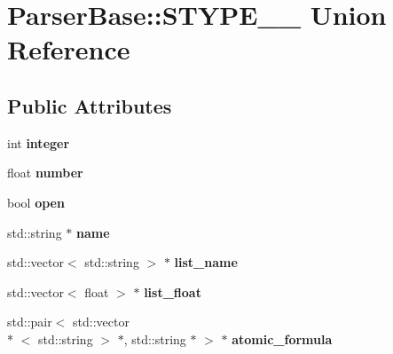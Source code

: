 \hypertarget{unionParserBase_1_1STYPE____}{\section{Parser\+Base\+:\+:S\+T\+Y\+P\+E\+\_\+\+\_\+ Union Reference}
\label{unionParserBase_1_1STYPE____}
}
\subsection*{Public Attributes}
\begin{DoxyCompactItemize}
\item 
\hypertarget{unionParserBase_1_1STYPE_____af8152366c391a9a3c6dfeebd38dd6072}{int {\bfseries integer}}\label{unionParserBase_1_1STYPE_____af8152366c391a9a3c6dfeebd38dd6072}

\item 
\hypertarget{unionParserBase_1_1STYPE_____a3d0cb98bf31057ecd7a908afbe3ca55f}{float {\bfseries number}}\label{unionParserBase_1_1STYPE_____a3d0cb98bf31057ecd7a908afbe3ca55f}

\item 
\hypertarget{unionParserBase_1_1STYPE_____a0666d59fce9371c2a4d93b2fa8b299ce}{bool {\bfseries open}}\label{unionParserBase_1_1STYPE_____a0666d59fce9371c2a4d93b2fa8b299ce}

\item 
\hypertarget{unionParserBase_1_1STYPE_____af9a7a51fe1e387c4c8214d7942e2a58a}{std\+::string $\ast$ {\bfseries name}}\label{unionParserBase_1_1STYPE_____af9a7a51fe1e387c4c8214d7942e2a58a}

\item 
\hypertarget{unionParserBase_1_1STYPE_____acadc01542881f7e6add2ea0e05562e8b}{std\+::vector$<$ std\+::string $>$ $\ast$ {\bfseries list\+\_\+name}}\label{unionParserBase_1_1STYPE_____acadc01542881f7e6add2ea0e05562e8b}

\item 
\hypertarget{unionParserBase_1_1STYPE_____a4bd64b9de1820c87495a8bd2c914e9ad}{std\+::vector$<$ float $>$ $\ast$ {\bfseries list\+\_\+float}}\label{unionParserBase_1_1STYPE_____a4bd64b9de1820c87495a8bd2c914e9ad}

\item 
\hypertarget{unionParserBase_1_1STYPE_____a96b9185e300e325c901f02ab6c4b3297}{std\+::pair$<$ std\+::vector\\*
$<$ std\+::string $>$ $\ast$, std\+::string $\ast$ $>$ $\ast$ {\bfseries atomic\+\_\+formula}}\label{unionParserBase_1_1STYPE_____a96b9185e300e325c901f02ab6c4b3297}


\end{DoxyCompactItemize}

